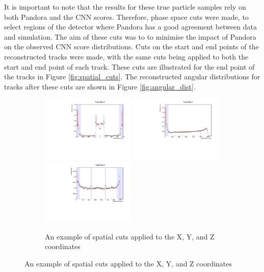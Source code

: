It is important to note that the results for these true particle 
samples rely on both Pandora and the CNN scores. Therefore, phase space cuts 
were made, to select regions of the detector where Pandora has a good 
agreement between data and simulation. The aim of these cuts was to to 
minimise the impact of Pandora on the observed CNN score distributions. Cuts 
on the start and end points of the reconstructed tracks were made, with the 
same cuts being applied to both the start and end point of each track. These 
cuts are illustrated for the end point of the tracks in Figure 
\ref{fig:spatial_cuts}.  The reconstructed angular distributions for tracks 
after these cuts are shown in Figure \ref{fig:angular_dist}.

\begin{figure}

	\begin{subfigure}[b]{\textwidth}
		\centering
		\includegraphics[width=0.49\textwidth]{figures/endX_nocuts.pdf}
		\hfill
		\includegraphics[width=0.49\textwidth]{figures/endY_nocuts.pdf}
		\includegraphics[width=0.49\textwidth]{figures/endZ_nocuts.pdf}
		\caption {An example of spatial cuts applied to the X, Y, and Z coordinates
}
\end{subfigure}
\end{figure}
